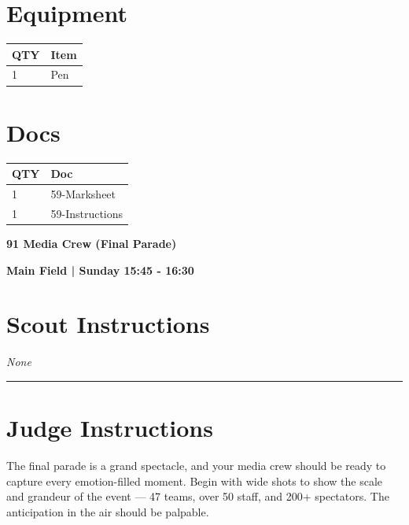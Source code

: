 \documentclass[10pt]{article}
\newcommand{\newtitle}[1]{\begin{center}{\Huge\bfseries #1 }\\ \vspace{5mm}\end{center}}
\newcommand{\newsubtitle}[1]{\begin{center}{\color{grey}\Large\bfseries #1 }\\ \vspace{5mm}\end{center}}
\begin{document}
	\begin{multicols}{2}

		\section*{\faWrench \: Equipment}

		
	\begin{center}
			\begin{tabular}{p{2cm}p{4cm}}


				\textbf{QTY} & \textbf{Item} \\\toprule
												1&Pen\\\midrule
								\end{tabular}

			\end{center}

		
		\vfill\null
		\columnbreak

			\section*{\faFile \: Docs}
		 	\begin{center}
			\begin{tabular}{p{2cm}p{4cm}}

			\textbf{QTY} & \textbf{Doc} \\\toprule
										1&59-Marksheet\\\midrule
										1&59-Instructions\\\midrule
							\end{tabular}
			\end{center}
	

		\vfill\null

		\end{multicols}



	\vspace{1cm}


	\clearpage
		\newtitle{91 Media Crew (Final Parade) }
	\newsubtitle{Main Field | Sunday 15:45 - 16:30}
		\setcounter{section}{90}
	\section*{Scout Instructions}
		\textit{None}
	
	\vspace{0.5cm}
	\hrule
	\vspace{0.5cm}

		\section*{Judge Instructions}
		The final parade is a grand spectacle, and your media crew should be ready to capture every emotion-filled moment. Begin with wide shots to show the scale and grandeur of the event — 47 teams, over 50 staff, and 200+ spectators. The anticipation in the air should be palpable.
\end{document}
